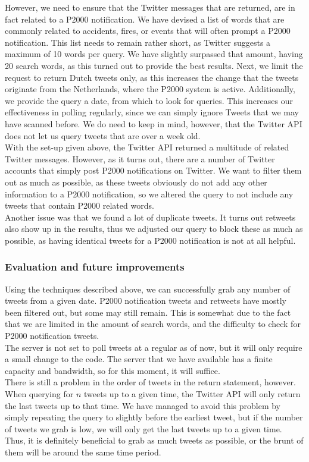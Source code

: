 However, we need to ensure that the Twitter messages that are returned, are in fact related to a P2000 notification.
We have devised a list of words that are commonly related to accidents, fires, or events that will often prompt a P2000 notification. 
This list needs to remain rather short, as Twitter suggests a maximum of 10 words per query.
We have slightly surpassed that amount, having 20 search words, as this turned out to provide the best results.
Next, we limit the request to return Dutch tweets only, as this increases the change that the tweets originate from the Netherlands, where the P2000 system is active.
Additionally, we provide the query a date, from which to look for queries. 
This increases our effectiveness in polling regularly, since we can simply ignore Tweets that we may have scanned before.
We do need to keep in mind, however, that the Twitter API does not let us query tweets that are over a week old. \\

With the set-up given above, the Twitter API returned a multitude of related Twitter messages.
However, as it turns out, there are a number of Twitter accounts that simply post P2000 notifications on Twitter.
We want to filter them out as much as possible, as these tweets obviously do not add any other information to a P2000 notification, so we altered the query to not include any tweets that contain P2000 related words. \\
Another issue was that we found a lot of duplicate tweets.
It turns out retweets also show up in the results, thus we adjusted our query to block these as much as possible, as having identical tweets for a P2000 notification is not at all helpful.

\subsubsection*{Evaluation and future improvements}
Using the techniques described above, we can successfully grab any number of tweets from a given date.
P2000 notification tweets and retweets have mostly been filtered out, but some may still remain.
This is somewhat due to the fact that we are limited in the amount of search words, and the difficulty to check for P2000 notification tweets. \\

The server is not set to poll tweets at a regular as of now, but it will only require a small change to the code.
The server that we have available has a finite capacity and bandwidth, so for this moment, it will suffice. \\
There is still a problem in the order of tweets in the return statement, however.
When querying for $n$ tweets up to a given time, the Twitter API will only return the last tweets up to that time.
We have managed to avoid this problem by simply repeating the query to slightly before the earliest tweet, but if the number of tweets we grab is low, we will only get the last tweets up to a given time.
Thus, it is definitely beneficial to grab as much tweets as possible, or the brunt of them will be around the same time period.